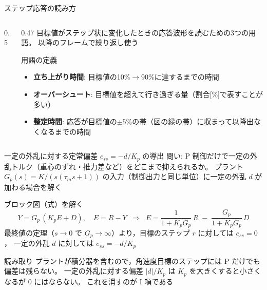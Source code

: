 \begin{frame}{ステップ応答の読み方\later}
  \begin{columns}[c]
    \begin{column}{0.5\textwidth}
      \centering
    \end{column}
    \begin{column}{0.47\textwidth}
      \footnotesize
      目標値がステップ状に変化したときの応答波形を読むための3つの用語。
      以降のフレームで繰り返し使う

      \begin{block}{用語の定義}\footnotesize
        \begin{itemize}\setlength{\itemsep}{0.4em}
          \item \textbf{立ち上がり時間}: 目標値の10\%$\to$90\%に達するまでの時間
          \item \textbf{オーバーシュート}: 目標値を超えて行き過ぎる量（割合[\%]で表すことが多い）
          \item \textbf{整定時間}: 応答が目標値の$\pm5\%$の帯（図の緑の帯）に収まって以降出なくなるまでの時間
        \end{itemize}
      \end{block}
    \end{column}
  \end{columns}
\end{frame}


\begin{frame}{一定の外乱に対する定常偏差 $e_{ss} = -d/K_p$ の導出\later}
  \vspace{0.2em}
  {\footnotesize
  問い: P 制御だけで一定の外乱トルク（重心のずれ・推力差など）をどこまで抑えられるか。
  プラント $G_p(s)=K/(s(\tau_m s+1))$ の入力（制御出力と同じ単位）に一定の外乱 $d$ が加わる場合を解く}

  \begin{block}{ブロック図（式）を解く}\footnotesize
    \setlength{\abovedisplayskip}{2pt}\setlength{\belowdisplayskip}{2pt}%
    \[
      Y = G_p\,(K_p E + D), \quad E = R - Y
      \;\;\Longrightarrow\;\;
      E = \frac{1}{1+K_p G_p}\,R \;-\; \frac{G_p}{1+K_p G_p}\,D
    \]
    最終値の定理（$s\to0$ で $G_p\to\infty$）より，目標のステップ $r$ に対しては $e_{ss}=0$，
    一定の外乱 $d$ に対しては $e_{ss}=-d/K_p$
  \end{block}

  \begin{alertblock}{読み取り}\footnotesize
    プラントが積分器を含むので，角速度目標のステップには P だけでも偏差は残らない。
    一定の外乱に対する偏差 $|d|/K_p$ は $K_p$ を大きくすると小さくなるが 0 にはならない。
    これを消すのが I 項である
  \end{alertblock}
\end{frame}

